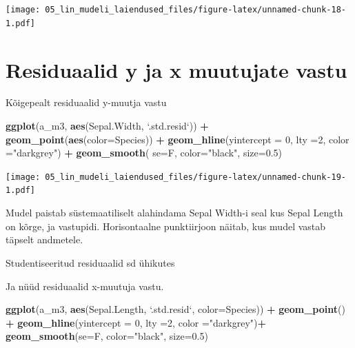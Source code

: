 \documentclass[]{book}
\newenvironment{Shaded}{\begin{snugshade}}{\end{snugshade}}
\newcommand{\KeywordTok}[1]{\textcolor[rgb]{0.13,0.29,0.53}{\textbf{#1}}}
\newcommand{\DataTypeTok}[1]{\textcolor[rgb]{0.13,0.29,0.53}{#1}}
\newcommand{\DecValTok}[1]{\textcolor[rgb]{0.00,0.00,0.81}{#1}}
\newcommand{\FloatTok}[1]{\textcolor[rgb]{0.00,0.00,0.81}{#1}}
\newcommand{\StringTok}[1]{\textcolor[rgb]{0.31,0.60,0.02}{#1}}
\newcommand{\OperatorTok}[1]{\textcolor[rgb]{0.81,0.36,0.00}{\textbf{#1}}}
\newcommand{\NormalTok}[1]{#1}
\begin{document}
\texttt{[image: 05\_lin\_mudeli\_laiendused\_files/figure-latex/unnamed-chunk-18-1.pdf]}

\section*{Residuaalid y ja x muutujate
vastu}\label{residuaalid-y-ja-x-muutujate-vastu}

Kõigepealt residuaalid y-muutja vastu

\begin{Shaded}
\begin{Highlighting}[]
\KeywordTok{ggplot}\NormalTok{(a_m3, }\KeywordTok{aes}\NormalTok{(Sepal.Width, }\StringTok{`}\DataTypeTok{.std.resid}\StringTok{`}\NormalTok{)) }\OperatorTok{+}\StringTok{ }\KeywordTok{geom_point}\NormalTok{(}\KeywordTok{aes}\NormalTok{(}\DataTypeTok{color=}\NormalTok{Species)) }\OperatorTok{+}\StringTok{ }\KeywordTok{geom_hline}\NormalTok{(}\DataTypeTok{yintercept =} \DecValTok{0}\NormalTok{, }\DataTypeTok{lty =}\DecValTok{2}\NormalTok{, }\DataTypeTok{color =}\StringTok{"darkgrey"}\NormalTok{) }\OperatorTok{+}\StringTok{ }
\StringTok{  }\KeywordTok{geom_smooth}\NormalTok{( }\DataTypeTok{se=}\NormalTok{F, }\DataTypeTok{color=}\StringTok{"black"}\NormalTok{, }\DataTypeTok{size=}\FloatTok{0.5}\NormalTok{)}
\end{Highlighting}
\end{Shaded}

\texttt{[image: 05\_lin\_mudeli\_laiendused\_files/figure-latex/unnamed-chunk-19-1.pdf]}

Mudel paistab süstemaatiliselt alahindama Sepal Width-i seal kus Sepal
Length on kõrge, ja vastupidi. Horisontaalne punktiirjoon näitab, kus
mudel vastab täpselt andmetele.

Studentiseeritud residuaalid sd ühikutes

Ja nüüd residuaalid x-muutuja vastu.

\begin{Shaded}
\begin{Highlighting}[]
\KeywordTok{ggplot}\NormalTok{(a_m3, }\KeywordTok{aes}\NormalTok{(Sepal.Length, }\StringTok{`}\DataTypeTok{.std.resid}\StringTok{`}\NormalTok{, }\DataTypeTok{color=}\NormalTok{Species)) }\OperatorTok{+}\StringTok{ }
\StringTok{  }\KeywordTok{geom_point}\NormalTok{() }\OperatorTok{+}
\StringTok{  }\KeywordTok{geom_hline}\NormalTok{(}\DataTypeTok{yintercept =} \DecValTok{0}\NormalTok{, }\DataTypeTok{lty =}\DecValTok{2}\NormalTok{, }\DataTypeTok{color =}\StringTok{"darkgrey"}\NormalTok{)}\OperatorTok{+}
\StringTok{  }\KeywordTok{geom_smooth}\NormalTok{(}\DataTypeTok{se=}\NormalTok{F, }\DataTypeTok{color=}\StringTok{"black"}\NormalTok{, }\DataTypeTok{size=}\FloatTok{0.5}\NormalTok{)}
\end{Highlighting}
\end{Shaded}
\end{document}
